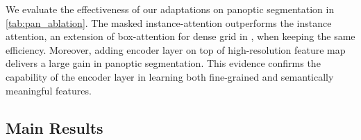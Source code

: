      We evaluate the effectiveness of our adaptations on panoptic segmentation in \cref{tab:pan_ablation}. The masked instance-attention outperforms the instance attention, an extension of box-attention for dense grid in \citep{nguyen2022boxer}, when keeping the same efficiency. Moreover, adding encoder layer on top of high-resolution feature map delivers a large gain in panoptic segmentation. This evidence confirms the capability of the encoder layer in learning both fine-grained and semantically meaningful features.
    
    \subsection{Main Results}
    
